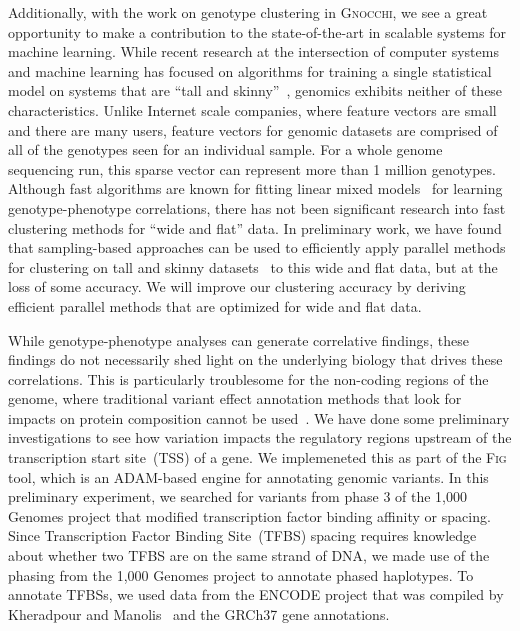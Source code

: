 \documentclass[11pt]{article} %
\begin{document}
Additionally, with the work on genotype clustering in \textsc{Gnocchi}, we see a great
opportunity to make a contribution to the state-of-the-art in scalable systems for machine
learning. While recent research at the intersection of computer systems and machine learning
has focused on algorithms for training a single statistical model on systems that are ``tall
and skinny''~\cite{meng15, zadeh15}, genomics exhibits neither of these characteristics.
Unlike Internet scale companies, where feature vectors are small and there are many users,
feature vectors for genomic datasets are comprised of all of the genotypes seen for an
individual sample. For a whole genome sequencing run, this sparse vector can represent more
than 1 million genotypes. Although fast algorithms are known for fitting linear mixed
models~\cite{lippert11} for learning genotype-phenotype correlations, there has not been
significant research into fast clustering methods for ``wide and flat'' data. In preliminary
work, we have found that sampling-based approaches can be used to efficiently apply parallel
methods for clustering on tall and skinny datasets~\cite{bahmani12, meng15} to this wide and
flat data, but at the loss of some accuracy. We will improve our clustering accuracy by deriving
efficient parallel methods that are optimized for wide and flat data.

While genotype-phenotype analyses can generate correlative findings, these findings do not
necessarily shed light on the underlying biology that drives these correlations. This is
particularly troublesome for the non-coding regions of the genome, where traditional variant
effect annotation methods that look for impacts on protein composition cannot be
used~\cite{mclaren10}. We have done some preliminary investigations to see how variation impacts
the regulatory regions upstream of the transcription start site~(TSS) of a gene. We implemeneted
this as part of the \textsc{Fig} tool, which is an \textsc{ADAM}-based engine for annotating
genomic variants. In this preliminary experiment, we searched for variants from phase 3 of the
1,000 Genomes project that modified transcription factor binding affinity or spacing. Since
Transcription Factor Binding Site~(TFBS) spacing requires knowledge about whether two TFBS are
on the same strand of DNA, we made use of the phasing from the 1,000 Genomes project to annotate
phased haplotypes. To annotate TFBSs, we used data from the ENCODE project that was compiled by
Kheradpour and Manolis~\cite{kheradpour14} and the GRCh37 gene annotations.
\end{document}
